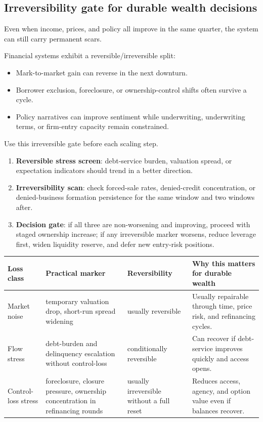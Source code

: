 \documentclass[11pt,openany]{book}
\begin{document}
\subsection{Irreversibility gate for durable wealth decisions}
\label{subsec:irreversibility-gate}

Even when income, prices, and policy all improve in the same quarter, the system can still carry permanent scars.

Financial systems exhibit a reversible/irreversible split:

\begin{itemize}
  \item Mark-to-market gain can reverse in the next downturn.
  \item Borrower exclusion, foreclosure, or ownership-control shifts often survive a cycle.
  \item Policy narratives can improve sentiment while underwriting, underwriting terms, or firm-entry capacity remain constrained.
\end{itemize}

Use this irreversible gate before each scaling step.

\begin{enumerate}
  \item \textbf{Reversible stress screen}: debt-service burden, valuation spread, or expectation indicators should trend in a better direction.
  \item \textbf{Irreversibility scan}: check forced-sale rates, denied-credit concentration, or denied-business formation persistence for the same window and two windows after.
  \item \textbf{Decision gate}: if all three are non-worsening and improving, proceed with staged ownership increase; if any irreversible marker worsens, reduce leverage first, widen liquidity reserve, and defer new entry-risk positions.
\end{enumerate}

\begin{center}
\small
\begin{tabularx}{\textwidth}{>{\raggedright\arraybackslash}p{}>{\raggedright\arraybackslash}p{}p{}X}
\toprule
\textbf{Loss class} & \textbf{Practical marker} & \textbf{Reversibility} & \textbf{Why this matters for durable wealth} \\ 
\midrule
Market noise & temporary valuation drop, short-run spread widening & usually reversible & Usually repairable through time, price risk, and refinancing cycles. \\
Flow stress & debt-burden and delinquency escalation without control-loss & conditionally reversible & Can recover if debt-service improves quickly and access opens. \\
Control-loss stress & foreclosure, closure pressure, ownership concentration in refinancing rounds & usually irreversible without a full reset & Reduces access, agency, and option value even if balances recover. \\
\bottomrule
\end{tabularx}
\normalsize
\end{center}
\end{document}
